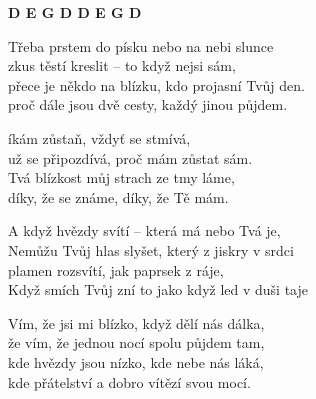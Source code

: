 
{\footnotesize \textbf{D E G D D E G D}}

\ve{}
Třeba prstem do písku nebo na nebi slunce\\
zkus těstí kreslit – to když nejsi sám,\\
přece je někdo na blízku, kdo projasní Tvůj den. \\
proč dále jsou dvě cesty, každý jinou půjdem.

\cho{}
íkám zůstaň, vždyť se stmívá, \\
už se připozdívá, proč mám zůstat sám.\\
Tvá blízkost můj strach ze tmy láme,\\
díky, že se známe, díky, že Tě mám.

\ve{}
A když hvězdy svítí – která má nebo Tvá je,\\
Nemůžu Tvůj hlas slyšet, který z jiskry v srdci\\
plamen rozsvítí, jak paprsek z ráje,\\
Když smích Tvůj zní to jako když led v duši taje

\cho{}

\ve{}
Vím, že jsi mi blízko, když dělí nás dálka,\\
že vím, že jednou nocí spolu půjdem tam,\\
kde hvězdy jsou nízko, kde nebe nás láká,\\
kde přátelství a dobro vítězí svou mocí.

\cho{}

\esong